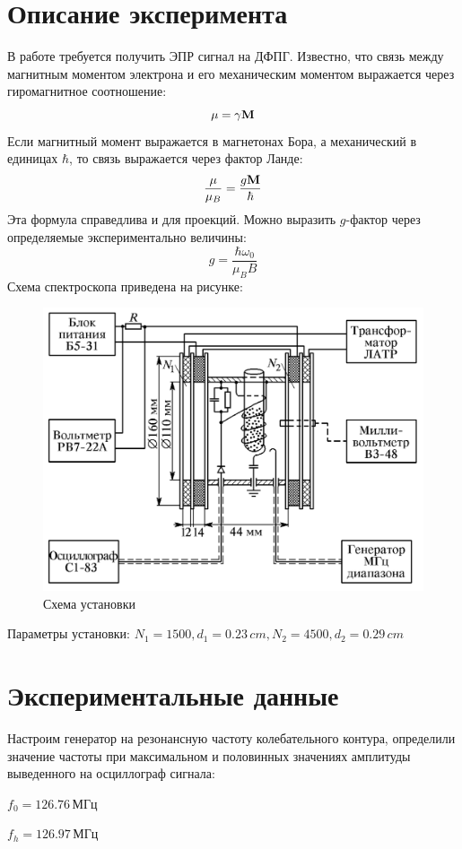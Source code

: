\documentclass[a4paper,12pt]{article}
\begin{document}
	\section{Описание эксперимента}
        В работе требуется получить ЭПР сигнал на ДФПГ. Известно, что связь между магнитным моментом электрона и его механическим моментом выражается через гиромагнитное соотношение:
        \begin{equation}
            \bf{\mu} = \gamma\bf{M}
        \end{equation}
        Если магнитный момент выражается в магнетонах Бора, а механический в единицах $\hbar$, то связь выражается через фактор Ланде:
        \begin{equation}
            \frac{\bf{\mu}}{\mu_B} = \frac{g\bf{M}}{\hbar}
        \end{equation}
        Эта формула справедлива и для проекций. Можно выразить $g$-фактор через определяемые экспериментально величины:
        \begin{equation}
            g = \frac{\hbar\omega_0}{\mu_B B}
        \end{equation}
        Схема спектроскопа приведена на рисунке:
        \begin{figure}[h!]
			\centering
			\includegraphics[width=0.5\linewidth]{exp}
			\caption{Схема установки}
		\end{figure}        
		
		Параметры установки: $N_1 = 1500, d_1 = 0.23\,cm, N_2 = 4500, d_2=0.29\,cm$
    \section{Экспериментальные данные}
    Настроим генератор на резонансную частоту колебательного контура, определили значение частоты при максимальном и половинных значениях амплитуды выведенного на осциллограф сигнала:
	
	$f_{0} = 126.76 \, \text{МГц}$
	
	$f_{h} = 126.97 \, \text{МГц}$
	
\end{document}
